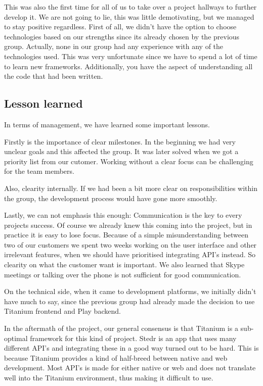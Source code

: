 This was also the first time for all of us to take over a project hallways to further develop it. We are not going to lie, this was little demotivating, but we managed to stay positive regardless. First of all, we didn't have the option to choose technologies based on our strengths since its already chosen by the previous group. Actually, none in our group had any experience with any of the technologies used. This was very unfortunate since we have to spend a lot of time to learn new frameworks. Additionally, you have the aspect of understanding all the code that had been written. 

	\subsection{Lesson learned}

In terms of management, we have learned some important lessons.

Firstly is the importance of clear milestones. In the beginning we had very unclear goals and this affected the group. It was later solved when we got a priority list from our cutomer. Working without a clear focus can be challenging for the team members.

Also, clearity internally. If we had been a bit more clear on responsibilities within the group, the development process would have gone more smoothly.

Lastly, we can not emphasis this enough: Communication is the key to every projects success. Of course we already knew this coming into the project, but in practice it is easy to lose focus. Because of a simple misunderstanding between two of our customers we spent two weeks working on the user interface and other irrelevant features, when we should have prioritised integrating API’s instead. So clearity on what the customer want is important. We also learned that Skype meetings or talking over the phone is not sufficient for good communication.

On the technical side, when it came to development platforms, we initially didn't have much to say, since the previous group had already made the decision to use Titanium frontend and Play backend.

In the aftermath of the project, our general consensus is that Titanium is a sub-optimal framework for this kind of project. Stedr is an app that uses many different API's and integrating these in a good way turned out to be hard. This is because Titanium provides a kind of half-breed between native and web development. Most API's is made for either native or web and does not translate well into the Titanium environment, thus making it difficult to use.


